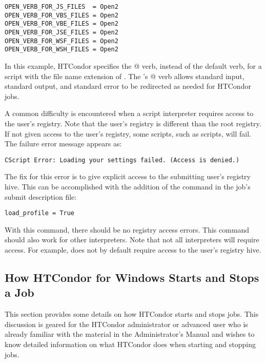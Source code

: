 \begin{verbatim}
OPEN_VERB_FOR_JS_FILES  = Open2
OPEN_VERB_FOR_VBS_FILES = Open2
OPEN_VERB_FOR_VBE_FILES = Open2
OPEN_VERB_FOR_JSE_FILES = Open2
OPEN_VERB_FOR_WSF_FILES = Open2
OPEN_VERB_FOR_WSH_FILES = Open2
\end{verbatim}

In this example, HTCondor specifies the @ verb,
instead of the default \verb@Open@ verb,
for a script with the file name extension of \verb@wsh@.
The 's @ verb allows standard input,
standard output, and standard error to be redirected
as needed for HTCondor jobs.

A common difficulty is encountered when
a script interpreter requires access to the user's registry.
Note that the user's registry is different than the root registry.
If not given access to the user's registry,
some scripts, such as  scripts,
will fail.
The failure error message appears as: 

\begin{verbatim}
CScript Error: Loading your settings failed. (Access is denied.)
\end{verbatim}

The fix for this error is to give explicit access to the submitting
user's registry hive.  This can be accomplished with the addition of
the  command in the job's submit description
file:

\begin{verbatim}
load_profile = True
\end{verbatim}

With this command,
there should be no registry access errors.
This command should also work for other interpreters.
Note that not all interpreters will require access.
For example,
 does not by default require access to the user's
registry hive.

\subsection{How HTCondor for Windows Starts and Stops a Job}

This section provides some details on how HTCondor starts and stops jobs.
This discussion is geared for the HTCondor administrator or advanced user who is
already familiar with the material in the Administrator's Manual
and wishes to know detailed information on what HTCondor does when
starting and stopping jobs.

